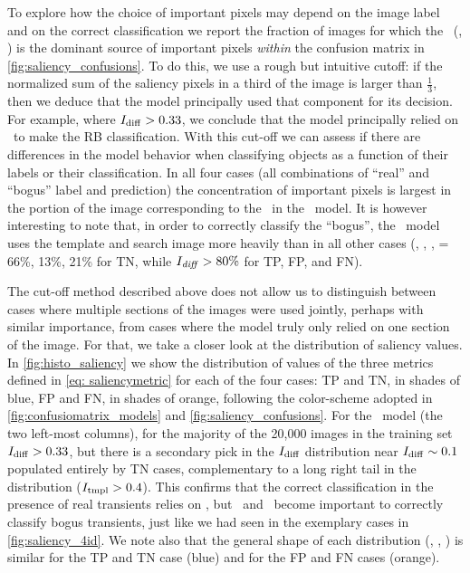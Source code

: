 To explore how the choice of important pixels may depend on the image label and on the correct classification we report  the fraction of images for which the \diff\ (\search, \temp) is the dominant source of important pixels {\it within} the confusion matrix in \autoref{fig:saliency_confusions}. To do this, we use a rough but intuitive cutoff: if the normalized sum of the saliency pixels in a third of the image is larger than $\frac{1}{3}$, then we deduce that the model principally used that component for its decision. For example, where $I_\mathrm{diff} > 0.33$, we conclude that the model principally relied on \diff\ to make the RB classification. With this cut-off we can assess if there are differences in the model behavior when classifying objects as a function of their labels or their classification.
In all four cases (all combinations of ``real'' and ``bogus'' label and prediction) the concentration of important pixels is largest in the portion of the image corresponding to the \diff\  in the \diabased\ model. It is however interesting to note that, in order to correctly classify the ``bogus'', the \diabased\ model uses the template and search image more heavily than in all other cases (\diff, \search, \temp,  = 66\%, 13\%, 21\% for TN, while $I_{\it diff}>80\%$ for TP, FP, and FN). 

The cut-off method described above does not allow us to distinguish between cases where multiple sections of the images were used jointly, perhaps with similar importance, from cases where the model truly only relied on one section of the image. For that, we take a closer look at the distribution of saliency values. 
In \autoref{fig:histo_saliency} we show the distribution of values of the three metrics defined in \autoref{eq: saliencymetric} for each of the four cases: TP and TN, in shades of blue, FP and FN, in shades of orange, following the color-scheme adopted in \autoref{fig:confusiomatrix_models} and \autoref{fig:saliency_confusions}. For the \diabased\ model (the two left-most columns), for the majority of the 20,000 images in the training set $I_\mathrm{diff} > 0.33$, but there is a secondary pick in the $I_\mathrm{diff}$ distribution near $I_\mathrm{diff} \sim0.1$ populated entirely by TN cases, complementary to a long right tail in the \itempl distribution ($I_\mathrm{tmpl} > 0.4$). This confirms that the correct classification in the presence of real transients relies on \diff, but \temp\ and \search\ become important to correctly classify bogus transients, just like we had seen in the exemplary cases in \autoref{fig:saliency_4id}. We note also that the general shape of each distribution (\idiff, \isearch, \itempl) is similar for the TP and TN case (blue) and for the FP and FN cases (orange). 
 
